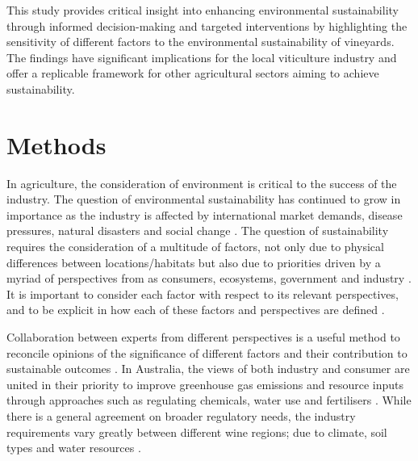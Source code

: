 
This study provides critical insight into enhancing environmental sustainability through informed decision-making and targeted interventions by highlighting the sensitivity of different factors to the environmental sustainability of vineyards. The findings have significant implications for the local viticulture industry and offer a replicable framework for other agricultural sectors aiming to achieve sustainability.

\section{Methods}

In agriculture, the consideration of environment is critical to the success of the industry. The question of environmental sustainability has continued to grow in importance as the industry is affected by international market demands, disease pressures, natural disasters and social change \citep{wineaustraliaNationalVintageReport2022,wineaustraliaNationalVintageReport2020,wineaustraliaNationalVintageReport2021,cassonMultidisciplinaryApproachAssess2022}. The question of sustainability requires the consideration of a multitude of factors, not only due to physical differences between locations/habitats but also due to priorities driven by a myriad of perspectives from as consumers, ecosystems, government and industry \citep{baianoOverviewSustainabilityWine2021,wayeCarbonFootprintsFood2008}. It is important to consider each factor with respect to its relevant perspectives, and to be explicit in how each of these factors and perspectives are defined \citep{santiago-brownSustainabilityAssessmentWineGrape2015}.

Collaboration between experts from different perspectives is a useful method to reconcile opinions of the significance of different factors and their contribution to sustainable outcomes \citep{dichiaraCollaborativeApproachAchieving2024}. In Australia, the views of both industry and consumer are united in their priority to improve greenhouse gas emissions and resource inputs through approaches such as regulating chemicals, water use and fertilisers \citep{dumbrellComparingAustralianPublic2024}. While there is a general agreement on broader regulatory needs, the industry requirements vary greatly between different wine regions; due to climate, soil types and water resources \citep{abbalDecisionSupportSystem2016,agostaRegionalClimateVariability2012}.


